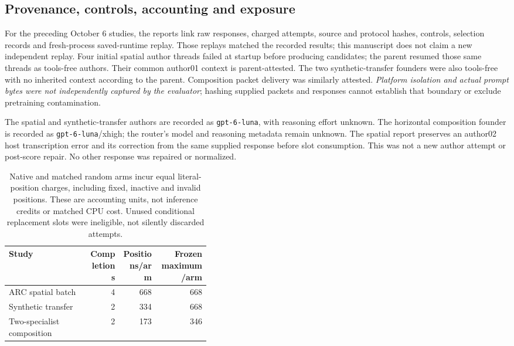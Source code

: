 \documentclass[11pt]{article}
\begin{document}
\subsection{Provenance, controls, accounting and exposure}
For the preceding October 6 studies, the reports link raw responses, charged attempts, source and protocol hashes,
controls, selection records and fresh-process saved-runtime replay. Those replays matched the
recorded results; this manuscript does not claim a new independent replay. Four initial spatial
author threads failed at startup before producing candidates; the parent resumed those same
threads as tools-free authors. Their common author01 context is parent-attested. The two
synthetic-transfer founders were also tools-free with no inherited context according to the
parent. Composition packet delivery was similarly attested. \emph{Platform isolation and actual
prompt bytes were not independently captured by the evaluator}; hashing supplied packets and
responses cannot establish that boundary or exclude pretraining contamination.

The spatial and synthetic-transfer authors are recorded as \texttt{gpt-6-luna}, with reasoning
effort unknown. The horizontal composition founder is recorded as \texttt{gpt-6-luna}/xhigh;
the router's model and reasoning metadata remain unknown. The spatial report preserves an
author02 host transcription error and its correction from the same supplied response before
slot consumption. This was not a new author attempt or post-score repair. No other response
was repaired or normalized.

\begin{table}[!htbp]
\centering\small
\begin{tabular}{@{}p{0.40\linewidth}rrr@{}}
\toprule
Study & Completions & Positions/arm & Frozen maximum/arm\\
\midrule
ARC spatial batch & 4 & 668 & 668\\
Synthetic transfer & 2 & 334 & 668\\
Two-specialist composition & 2 & 173 & 346\\
\bottomrule
\end{tabular}
\caption{Native and matched random arms incur equal literal-position charges, including fixed,
inactive and invalid positions. These are accounting units, not inference credits or matched CPU
cost. Unused conditional replacement slots were ineligible, not silently discarded attempts.}
\label{tab:nativebudget}
\end{table}
\end{document}
